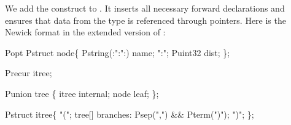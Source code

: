 We add the construct  to \pads{}. It inserts all
necessary forward declarations and ensures that data from the type is
referenced through pointers. Here is the Newick format in the extended
version of \pads{}:

\begin{code}
Popt Pstruct node\{
  Pstring(:":":) name; ":";
  Puint32 dist;
\};\linebreak

Precur itree;\linebreak

Punion tree \{
  itree internal;
  node leaf;
\};\linebreak

Pstruct itree\{
  "(";
  tree[] branches: Psep(",") && Pterm(")");
  ")";
\};
\end{code}

